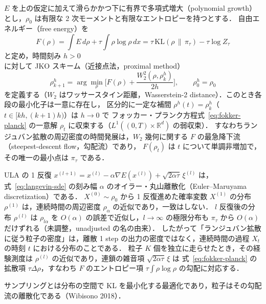\documentclass[a4paper,11pt]{article}
\newcommand{\RR}{\mathbb{R}}
\begin{document}
{\begin{thm}
$E$ を上の仮定に加えて滑らかかつ下に有界で多項式増大（polynomial growth）とし，$\rho_0$ は有限な 2 次モーメントと有限なエントロピーを持つとする．
自由エネルギー（free energy）を
\begin{equation}
  F(\rho) = \int E \, d\rho + \tau \int \rho \log \rho \, dx
  = \tau\, \mathrm{KL}(\rho \,\|\, \pi_\tau) - \tau \log Z_\tau
  \label{eq:free-energy}
\end{equation}
と定め，時間刻み $h > 0$ に対して JKO スキーム（近接点法，proximal method）
\begin{equation}
  \rho^h_{k+1} = \arg\min_{\rho} \Big[ F(\rho) + \frac{W_2^2(\rho, \rho^h_k)}{2h} \Big], \qquad \rho^h_0 = \rho_0
  \label{eq:jko}
\end{equation}
を定義する（$W_2$ はワッサースタイン距離，Wasserstein-2 distance）．このとき各段の最小化子は一意に存在し，
区分的に一定な補間 $\rho^h(t) = \rho^h_k$（$t \in [kh, (k+1)h)$）は $h \to 0$ で
フォッカー・プランク方程式~\eqref{eq:fokker-planck} の一意解 $\rho_t$ に収束する（$L^1((0,T) \times \RR^d)$ の弱収束）．
すなわちランジュバン拡散の周辺密度の時間発展は，$W_2$ 幾何に関する $F$ の最急降下流（steepest-descent flow，勾配流）であり，
$F(\rho_t)$ は $t$ について単調非増加で，その唯一の最小点は $\pi_\tau$ である．
\end{thm}

\begin{rem}
ULA の 1 反復 $x^{(l+1)} = x^{(l)} - \alpha \nabla E(x^{(l)}) + \sqrt{2\alpha\tau}\, \xi^{(l)}$ は，
式~\eqref{eq:langevin-sde} の刻み幅 $\alpha$ のオイラー・丸山離散化（Euler--Maruyama discretization）である．
$X^{(0)} \sim \rho_0$ から 1 反復進めた確率変数 $X^{(1)}$ の分布 $\rho^{(1)}$ は，連続時間の周辺密度 $\rho_\alpha$ の近似であり，一致はしない．
$l$ 反復後の分布 $\rho^{(l)}$ は $\rho_{l\alpha}$ を $O(\alpha)$ の誤差で近似し，$l \to \infty$ の極限分布も $\pi_\tau$ から $O(\alpha)$ だけずれる（未調整，unadjusted の名の由来）．
したがって「ランジュバン拡散に従う粒子の密度」は，離散 1 step の出力の密度ではなく，連続時間の過程 $X_t$ の時刻 $t$ における分布のことである．
粒子 $K$ 個を独立に走らせたとき，その経験測度は $\rho^{(l)}$ の近似であり，連鎖の雑音項 $\sqrt{2\alpha\tau}\,\xi$ は
式~\eqref{eq:fokker-planck} の拡散項 $\tau \Delta \rho$，すなわち $F$ のエントロピー項 $\tau \int \rho \log \rho$ の勾配に対応する．
\end{rem}
}

サンプリングとは分布の空間で KL を最小化する最適化であり，粒子はその勾配流の離散化である（Wibisono 2018）．
\end{document}
